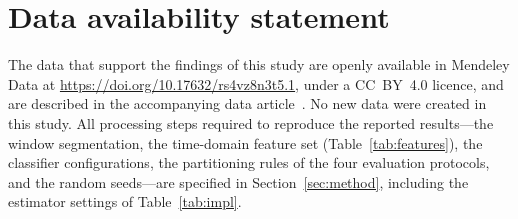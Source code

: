 \documentclass[anonymous]{iopjournal}
\begin{document}









\section*{Data availability statement}
The data that support the findings of this study are openly available in
Mendeley Data at \url{https://doi.org/10.17632/rs4vz8n3t5.1}, under a
CC~BY~4.0 licence, and are described in the accompanying data
article~\cite{ertargin2026smartphone, ertargin2026dataset}. No new data were
created in this study. All processing steps
required to reproduce the reported results---the window segmentation, the
time-domain feature set (Table~\ref{tab:features}), the classifier
configurations, the partitioning rules of the four evaluation protocols, and the
random seeds---are specified in Section~\ref{sec:method}, including the estimator settings of
Table~\ref{tab:impl}.



\end{document}
